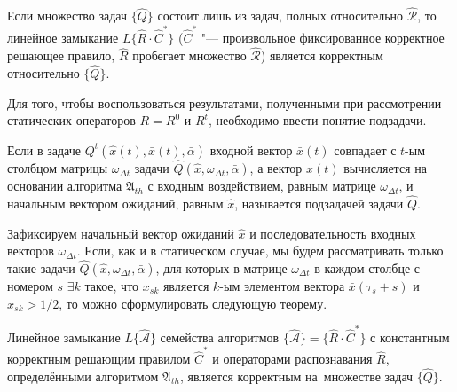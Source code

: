 \begin{Pred}
	\label{pred:correctness_d}
	Если множество задач $\{\hat Q\}$ состоит лишь из задач, полных относительно $\hat{\mathcal R}$, то линейное замыкание $L\{\hat R{\cdot}\hat C^*\}$ ($\hat C^*$ "--- произвольное фиксированное корректное решающее правило, $\hat R$ пробегает множество $\hat{\mathcal R}$) является корректным относительно $\{\hat Q\}$.
\end{Pred}
	
Для того, чтобы воспользоваться результатами, полученными при рассмотрении статических операторов $R=R^0$ и $R^t$, необходимо ввести понятие подзадачи.

\begin{Def}
	Если в задаче $Q^t(\hat x(t),\bar x(t),\bar\alpha)$ входной вектор $\bar x(t)$ совпадает с $t$-ым столбцом матрицы $\omega_{\Delta t}$ задачи $\hat Q(\hat x,\omega_{\Delta t},\bar\alpha)$, а вектор $\hat x(t)$ вычисляется на основании алгоритма $\mathfrak A_{th}$ с входным воздействием, равным матрице $\omega_{\Delta t}$, и начальным вектором ожиданий, равным $\hat x$, называется подзадачей задачи $\hat Q$.
\end{Def}

Зафиксируем начальный вектор ожиданий $\hat{x}$ и последовательность входных векторов $\omega_{\Delta{t}}$. Если, как и в статическом случае, мы будем рассматривать только такие задачи $\hat{Q}(\hat{x},\omega_{\Delta{t}},\bar{\alpha})$, для которых в матрице $\omega_{\Delta{t}}$ в каждом столбце с номером $s$ ${\exists}k$ такое, что $x_{sk}$ является $k$-ым элементом вектора $\bar{x}(\tau_s+s)$ и $x_{sk}>1/2$, то можно сформулировать следующую теорему.

\begin{Theorem}\label{th:correctness_d}
	Линейное замыкание $L\{\hat{\mathcal{A}}\}$ семейства алгоритмов $\{\hat{\mathcal{A}}\}=\{\hat{R}{\cdot}\hat{C}^*\}$ с константным корректным решающим правилом $\hat{C}^*$ и операторами распознавания $\hat{R}$, определёнными алгоритмом $\mathfrak{A}_{th}$, является корректным на~множестве задач $\{\hat{Q}\}$.
\end{Theorem}

